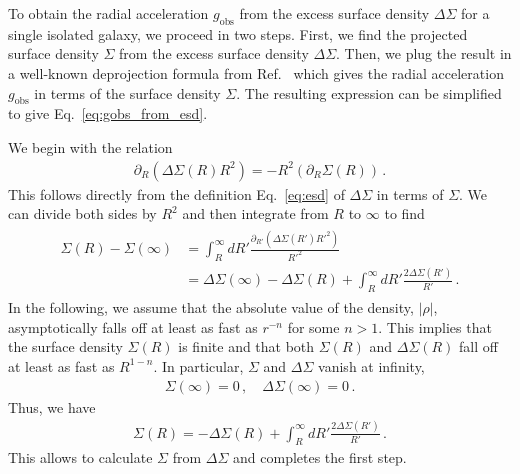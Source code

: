 \documentclass[a4paper,11pt]{article}
\begin{document}
To obtain the radial acceleration $g_{\mathrm{obs}}$ from the excess surface density $\Delta \Sigma$ for a single isolated galaxy, we proceed in two steps.
First, we find the projected surface density $\Sigma$ from the excess surface density $\Delta \Sigma$.
Then, we plug the result in a well-known deprojection formula from Ref.~\cite{Kent1986} which gives the radial acceleration $g_{\mathrm{obs}}$ in terms of the surface density $\Sigma$.
The resulting expression can be simplified to give Eq.~\eqref{eq:gobs_from_esd}.

We begin with the relation
\begin{align}
 \partial_R \left(\Delta \Sigma(R) R^2 \right) = - R^2 (\partial_R \Sigma(R)) \,.
\end{align}
This follows directly from the definition Eq.~\eqref{eq:esd} of $\Delta \Sigma$ in terms of $\Sigma$.
We can divide both sides by $R^2$ and then integrate from $R$ to $\infty$ to find
\begin{align}
\begin{split}
 \Sigma(R) - \Sigma(\infty)
 &= \int_R^{\infty} dR' \frac{\partial_{R'}(\Delta \Sigma(R') R'^2)}{R'^2}\\
 &=  \Delta \Sigma(\infty) - \Delta \Sigma(R) + \int_R^{\infty} dR' \frac{2 \Delta \Sigma(R')}{R'} \,.
\end{split}
\end{align}
In the following, we assume that the absolute value of the density, $|\rho|$, asymptotically falls off at least as fast as $r^{-n}$ for some $n > 1$.
This implies that the surface density $\Sigma(R)$ is finite and that both $\Sigma(R)$ and $\Delta \Sigma(R)$ fall off at least as fast as $R^{1-n}$.
In particular, $\Sigma$ and $\Delta \Sigma$ vanish at infinity,
\begin{align}
 \Sigma(\infty) = 0 \,, \quad \Delta \Sigma(\infty) = 0 \,.
\end{align}
Thus, we have
\begin{align}
 \label{eq:sd_from_esd}
 \Sigma(R) =  - \Delta \Sigma(R) + \int_R^{\infty} dR' \frac{2 \Delta \Sigma(R')}{R'} \,.
\end{align}
This allows to calculate $\Sigma$ from $\Delta \Sigma$ and completes the first step.
\end{document}
